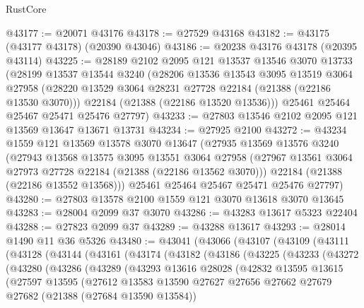 \begin{lexlean}{RustCore}
\begin{coremodule}
@43177 := @20071 @43176
@43178 := @27529 @43168
@43182 := @43175 (@43177 @43178) (@20390 @43046)
@43186 := @20238 @43176 @43178 (@20395 @43114)
@43225 := @28189
    @2102
    @2095
    @121
    @13537
    @13546
    @3070
    @13733
    (@28199
      @13537
      @13544
      @3240
      (@28206
        @13536
        @13543
        @3095
        @13519
        @3064
        @27958
        (@28220 @13529 @3064 @28231 @27728 @22184 (@21388 (@22186 @13530 @3070)))
        @22184
        (@21388 (@22186 @13520 @13536)))
      @25461
      @25464
      @25467
      @25471
      @25476
      @27797)
@43233 := @27803 @13546 @2102 @2095 @121 @13569 @13647 @13671 @13731
@43234 := @27925 @2100
@43272 := @43234
    @1559
    @121
    @13569
    @13578
    @3070
    @13647
    (@27935
      @13569
      @13576
      @3240
      (@27943
        @13568
        @13575
        @3095
        @13551
        @3064
        @27958
        (@27967 @13561 @3064 @27973 @27728 @22184 (@21388 (@22186 @13562 @3070)))
        @22184
        (@21388 (@22186 @13552 @13568)))
      @25461
      @25464
      @25467
      @25471
      @25476
      @27797)
@43280 := @27803 @13578 @2100 @1559 @121 @3070 @13618 @3070 @13645
@43283 := @28004 @2099 @37 @3070
@43286 := @43283 @13617 @5323 @22404
@43288 := @27823 @2099 @37
@43289 := @43288 @13617
@43293 := @28014 @1490 @11 @36 @5326
@43480 := @43041
    (@43066
      (@43107
        (@43109
          (@43111
            (@43128
              (@43144
                (@43161
                  (@43174
                    (@43182
                      (@43186
                        (@43225
                          (@43233
                            (@43272
                              (@43280
                                (@43286
                                  (@43289
                                    (@43293
                                      @13616
                                      @28028
                                      (@42832
                                        @13595
                                        @13615
                                        (@27597
                                          @13595
                                          (@27612
                                            @13583
                                            @13590
                                            @27627
                                            @27656
                                            @27662
                                            @27679
                                            @27682
                                            (@21388 (@27684 @13590 @13584))

\end{coremodule}
\end{lexlean}

